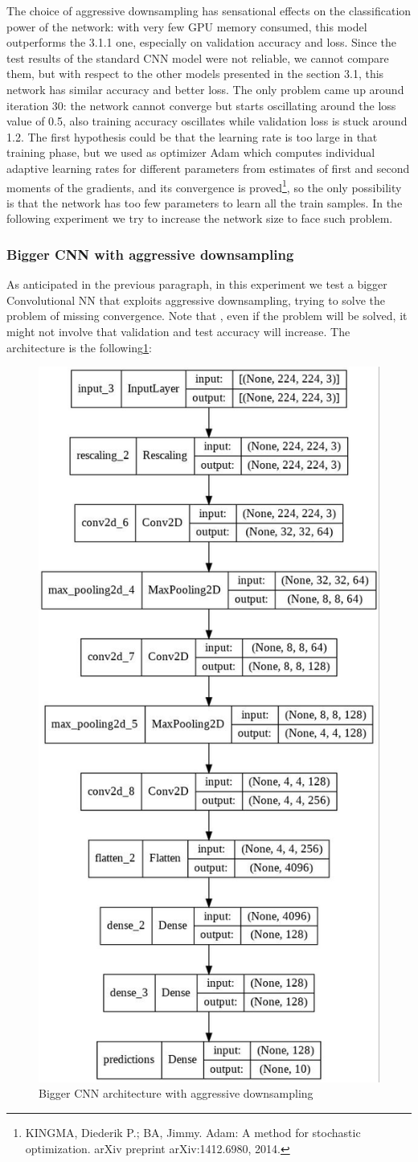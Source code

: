 \noindent The choice of aggressive downsampling has sensational effects on the classification power of the network: with very few GPU memory consumed, this model outperforms the 3.1.1 one, especially on validation accuracy and loss. Since the test results of the standard CNN model were not reliable, we cannot compare them, but with respect to the other models presented in the section 3.1, this network has similar accuracy and better loss. The only problem came up around iteration 30: the network cannot converge but starts oscillating around the loss value of 0.5, also training accuracy oscillates while validation loss is stuck around 1.2.
The first hypothesis could be that the learning rate is too large in that training phase, but we used as optimizer Adam which computes individual adaptive learning rates for different parameters from estimates of first and second moments of the gradients, and its convergence is proved\footnote{KINGMA, Diederik P.; BA, Jimmy. Adam: A method for stochastic optimization. arXiv preprint arXiv:1412.6980, 2014.}, so the only possibility is that the network has too few parameters to learn all the train samples. In the following experiment we try to increase the network size to face such problem.


\subsubsection{Bigger CNN with aggressive downsampling}
As anticipated in the previous paragraph, in this experiment we test a bigger Convolutional NN that exploits aggressive downsampling, trying to solve the problem of missing convergence. Note that , even if the problem will be solved, it might not involve that validation and test accuracy will increase. The architecture is the following\ref{fig:BiggerAggressiveDownsamplingCNN}:

\begin{figure}[H]
	\centering
	\includegraphics[height=0.6\textwidth]{img/scratch/bigger_aggressive_downsampling.jpg}
	\caption{Bigger CNN architecture with aggressive downsampling}
	\label{fig:BiggerAggressiveDownsamplingCNN}
\end{figure}

